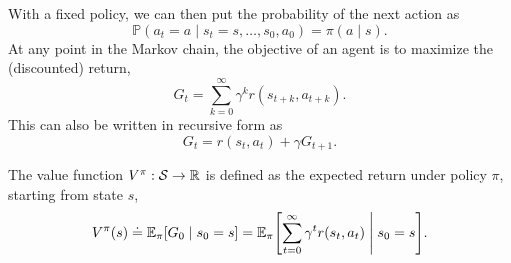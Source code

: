 With a fixed policy, we can then put the probability of the next action as \[
    \mathbb{P}(a_t = a \mid s_t = s, \ldots, s_0, a_0) = \pi(a\mid s).
\]
At any point in the Markov chain, the objective of an agent is to maximize the (discounted) return, \[
    G_t = \sum_{k=0}^{\infty} \gamma^k r(s_{t+k},a_{t+k}).
\]
This can also be written in recursive form as \[
    G_t = r(s_t, a_t) + \gamma G_{t+1}.
\]

\begin{definition}
    The value function $V^\pi: \mathcal{S} \to \mathbb{R}$ is defined as the expected return under policy
    $\pi$, starting from state $s$, \[
        V^\pi(s) \doteq \E_{\pi} \lft[ G_0 \;\middle|\; s_0=s \rgt] = \E_{\pi} \lft[ \sum_{t=0}^{\infty} \gamma^t r(s_t, a_t) \;\middle|\; s_0=s \rgt].
    \]
\end{definition}


